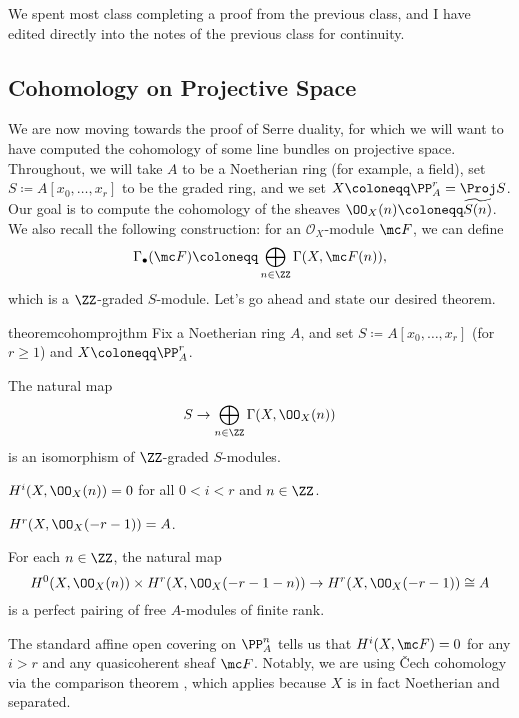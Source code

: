\documentclass[../notes.tex]{subfiles}
\begin{document}
We spent most class completing a proof from the previous class, and I have edited directly into the notes of the previous class for continuity.

\subsection{Cohomology on Projective Space}
We are now moving towards the proof of Serre duality, for which we will want to have computed the cohomology of some line bundles on projective space. Throughout, we will take $A$ to be a Noetherian ring (for example, a field), set $S\coloneqq A[x_0,\ldots,x_r]$ to be the graded ring, and we set $X\coloneqq\PP^r_A=\Proj S$. Our goal is to compute the cohomology of the sheaves $\OO_X(n)\coloneqq\widetilde{S(n)}$. We also recall the following construction: for an $\mathcal O_X$-module $\mc F$, we can define
\[\Gamma_\bullet(\mc F)\coloneqq\bigoplus_{n\in\ZZ}\Gamma(X,\mc F(n)),\]
which is a $\ZZ$-graded $S$-module. Let's go ahead and state our desired theorem.
\begin{restatable}{theorem}{cohomprojthm} \label{thm:cohom-proj-space}
	Fix a Noetherian ring $A$, and set $S\coloneqq A[x_0,\ldots,x_r]$ (for $r\ge1$) and $X\coloneqq\PP^r_A$.
	\begin{listalph}
		\item The natural map
		\[S\to\bigoplus_{n\in\ZZ}\Gamma(X,\OO_X(n))\]
		is an isomorphism of $\ZZ$-graded $S$-modules.
		\item $H^i(X,\OO_X(n))=0$ for all $0<i<r$ and $n\in\ZZ$.
		\item $H^r(X,\OO_X(-r-1))=A$.
		\item For each $n\in\ZZ$, the natural map
		\[H^0(X,\OO_X(n))\times H^r(X,\OO_X(-r-1-n))\to H^r(X,\OO_X(-r-1))\cong A\]
		is a perfect pairing of free $A$-modules of finite rank.
	\end{listalph}
\end{restatable}
\begin{remark}
	The standard affine open covering on $\PP^n_A$ tells us that $H^i(X,\mc F)=0$ for any $i>r$ and any quasicoherent sheaf $\mc F$. Notably, we are using \v Cech cohomology via the comparison theorem , which applies because $X$ is in fact Noetherian and separated.
\end{remark}
\end{document}
